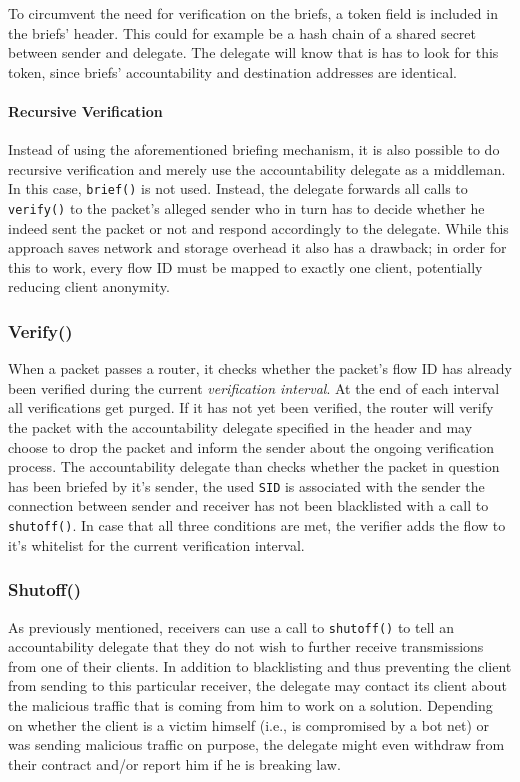 \documentclass{acm_proc_article-sp}
\begin{document}
To circumvent the need for verification on the briefs, a token field is included in the briefs' header. This could for example be a hash chain of a shared secret between sender and delegate. The delegate will know that is has to look for this token, since briefs' accountability and destination addresses are identical.

\paragraph{Recursive Verification}
Instead of using the aforementioned briefing mechanism, it is also possible to do recursive verification and merely use the accountability delegate as a middleman. In this case, \texttt{brief()} is not used. Instead, the delegate forwards all calls to \texttt{verify()} to the packet's alleged sender who in turn has to decide whether he indeed sent the packet or not and respond accordingly to the delegate. While this approach saves network and storage overhead it also has a drawback; in order for this to work, every flow ID must be mapped to exactly one client, potentially reducing client anonymity.

\subsubsection{Verify()}
When a packet passes a router, it checks whether the packet's flow ID has already been verified during the current \emph{verification interval}. At the end of each interval all verifications get purged. If it has not yet been verified, the router will verify the packet with the accountability delegate specified in the header and may choose to drop the packet and inform the sender about the ongoing verification process. The accountability delegate than checks whether the packet in question has been briefed by it's sender, the used \texttt{SID} is associated with the sender the connection between sender and receiver has not been blacklisted with a call to \texttt{shutoff()}. In case that all three conditions are met, the verifier adds the flow to it's whitelist for the current verification interval.

\subsubsection{Shutoff()}
As previously mentioned, receivers can use a call to \texttt{shutoff()} to tell an accountability delegate that they do not wish to further receive transmissions from one of their clients. In addition to blacklisting and thus preventing the client from sending to this particular receiver, the delegate may contact its client about the malicious traffic that is coming from him to work on a solution. Depending on whether the client is a victim himself (i.e., is compromised by a bot net) or was sending malicious traffic on purpose, the delegate might even withdraw from their contract and/or report him if he is breaking law.
\end{document}

